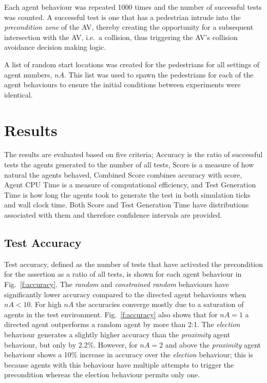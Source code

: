 \documentclass[letterpaper, 10 pt, journal, twoside]{IEEEtran}
\begin{document}
Each agent behaviour was repeated 1000 times and the number of successful tests was counted. A successful test is one that has a pedestrian intrude into the \textit{precondition zone} of the AV, thereby creating the opportunity for a subsequent intersection with the AV, i.e.\ a collision, thus triggering the AV's collision avoidance decision making logic.

A list of random start locations was created for the pedestrians for all settings of agent numbers, $nA$. This list was used to spawn the pedestrians for each of the agent behaviours to ensure the initial conditions between experiments were identical. 

\section{Results}\label{s:results}
The results are evaluated based on five criteria; Accuracy is the ratio of successful tests the agents generated to the number of all tests, Score is a measure of how natural the agents behaved, Combined Score combines accuracy with score, Agent CPU Time is a measure of computational efficiency, and Test Generation Time is how long the agents took to generate the test in both simulation ticks and wall clock time. Both Score and Test Generation Time have distributions associated with them and therefore confidence intervals are provided.


\subsection{Test Accuracy}
Test accuracy, defined as the number of tests that have activated the precondition for the assertion as a ratio of all tests, is shown for each agent behaviour in Fig.~\ref{f:accuracy}. The \textit{random} and \textit{constrained random} behaviours have significantly lower accuracy compared to the directed agent behaviours when $nA<10$. For high $nA$ the accuracies converge mostly due to a saturation of agents in the test environment.
%
Fig.~\ref{f:accuracy} also shows that for $nA=1$ a directed agent outperforms a random agent by more than 2:1. The \textit{election} behaviour generates a slightly higher accuracy than the \textit{proximity} agent behaviour, but only by 2.2\%. However, for $nA=2$ and above the \textit{proximity} agent behaviour shows a 10\% increase in accuracy over the \textit{election} behaviour; this is because agents with this behaviour have multiple attempts to trigger the precondition whereas the election behaviour permits only one. 
\end{document}
